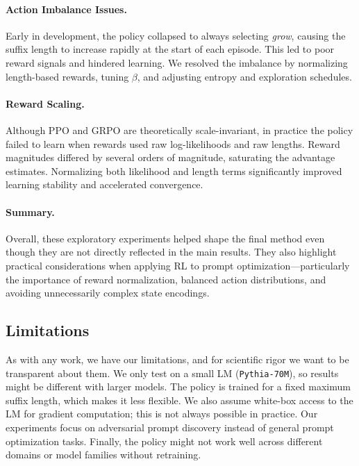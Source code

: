 \documentclass[11pt]{article}
\begin{document}
\paragraph{Action Imbalance Issues.}
Early in development, the policy collapsed to always selecting \emph{grow}, causing the suffix length to increase rapidly at the start of each episode. This led to poor reward signals and hindered learning. We resolved the imbalance by normalizing length-based rewards, tuning $\beta$, and adjusting entropy and exploration schedules.

\paragraph{Reward Scaling.}
Although PPO and GRPO are theoretically scale-invariant, in practice the policy failed to learn when rewards used raw log-likelihoods and raw lengths. Reward magnitudes differed by several orders of magnitude, saturating the advantage estimates. Normalizing both likelihood and length terms significantly improved learning stability and accelerated convergence.

\paragraph{Summary.}
Overall, these exploratory experiments helped shape the final method even though they are not directly reflected in the main results. They also highlight practical considerations when applying RL to prompt optimization—particularly the importance of reward normalization, balanced action distributions, and avoiding unnecessarily complex state encodings.

\subsection{Limitations}

As with any work, we have our limitations, and for scientific rigor we want to be transparent about them. We only test on a small LM (\texttt{Pythia-70M}), so results might be different with larger models. The policy is trained for a fixed maximum suffix length, which makes it less flexible. We also assume white-box access to the LM for gradient computation; this is not always possible in practice. Our experiments focus on adversarial prompt discovery instead of general prompt optimization tasks. Finally, the policy might not work well across different domains or model families without retraining.
\end{document}
